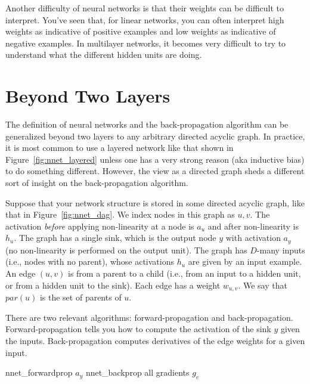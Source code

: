 Another difficulty of neural networks is that their weights can be
difficult to interpret.  You've seen that, for linear networks, you
can often interpret high weights as indicative of positive examples
and low weights as indicative of negative examples.  In multilayer
networks, it becomes very difficult to try to understand what the
different hidden units are doing.  



\section{Beyond Two Layers}


The definition of neural networks and the back-propagation algorithm
can be generalized beyond two layers to any arbitrary directed acyclic
graph.  In practice, it is most common to use a layered network like
that shown in Figure~\ref{fig:nnet_layered} unless one has a very
strong reason (aka inductive bias) to do something different.
However, the view as a directed graph sheds a different sort of
insight on the back-propagation algorithm.


Suppose that your network structure is stored in some directed acyclic
graph, like that in Figure~\ref{fig:nnet_dag}.  We index nodes in this
graph as $u,v$.  The activation \emph{before} applying non-linearity
at a node is $a_u$ and after non-linearity is $h_u$.  The graph has a
single sink, which is the output node $y$ with activation $a_y$ (no
non-linearity is performed on the output unit).  The graph has
$D$-many inputs (i.e., nodes with no parent), whose activations $h_u$
are given by an input example.  An edge $(u,v)$ is from a parent to a
child (i.e., from an input to a hidden unit, or from a hidden unit to
the sink).  Each edge has a weight $w_{u,v}$.  We say that
$\textit{par}(u)$ is the set of parents of $u$.

There are two relevant algorithms: forward-propagation and
back-propagation.  Forward-propagation tells you how to compute the
activation of the sink $y$ given the inputs.  Back-propagation
computes derivatives of the edge weights for a given input.

\newalgorithm%
  {nnet_forwardprop}%
  {}
  {
\ENDFOR
{}
\ENDFOR
\RETURN $a_y$
}
\newalgorithm%
  {nnet_backprop}%
  {}
  {
\ENDFOR
\ENDFOR
\RETURN all gradients $g_e$
}

